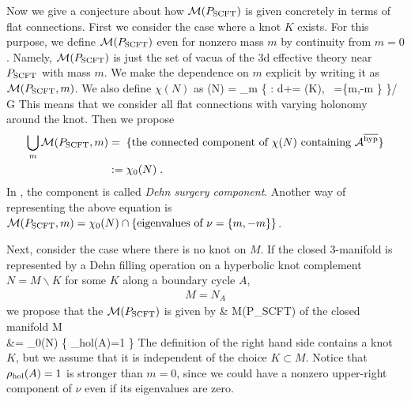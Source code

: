 \documentclass[a4paper,11pt]{article}
\def\cA{\mathcal{A}}
\def\CA{{\cal A}}
\def\CG{{\cal G}}
\def\CM{{\cal M}}
\def\beq#1\eeq{\begin{align}#1\end{align}}
\begin{document}
Now we give a conjecture about how $\CM(P_{\rm SCFT})$ is given concretely in terms of flat connections. 
First we consider the case where a knot $K$ exists.
For this purpose, we define $\CM(P_{\rm SCFT})$ even for nonzero mass $m$ by continuity from $m=0$.
Namely, $\CM(P_{\rm SCFT})$ is just the set of vacua of the 3d effective theory near $P_{\rm SCFT}$ with mass $m$.
We make the dependence on $m$ explicit by writing it as $\CM(P_{\rm SCFT},m)$.
We also define $\chi(N)$ as
\beq
\chi(N) =  \bigcup_m \{ \cA : d\cA+\cA\wedge \cA =\widetilde{ \nu} \delta (K),~ \widetilde{\nu}=\{m,-m \}   \}/ \CG \label{eq:chidef1}
\eeq
This means that we consider all flat connections with varying holonomy around the knot.
Then we propose
%
\begin{align}
\bigcup_m \CM(P_{\rm SCFT},m) &=\; \{\textrm{the connected component of $\chi(N)$ containing $\CA^{\rm \overline{hyp}}$} \} \nonumber \\
& := \chi_0(N)
 \;. \label{Dehn-surgery com}
\end{align}
%
In \cite{tillmann2012degenerations}, the component is called {\it Dehn surgery component}. 
Another way of representing the above equation is $\CM(P_{\rm SCFT},m)  = \chi_0(N) \cap \{ \text{eigenvalues of }\nu=\{ m,-m \} \}$.

Next, consider the case where there is no knot on $M$.
If the closed 3-manifold is represented by a Dehn filling operation on a hyperbolic knot complement $N=M \backslash K$ for some $K$ along a boundary cycle $A$,
%
\begin{align}
M = N_{A}
\end{align}
% 
we propose that the $ \CM(P_{\rm SCFT}) $ is given by
\beq
& \CM(P_{\rm SCFT}) \textrm{ of the closed manifold } M  \nonumber \\
&= \chi_0(N) \cap \{ \rho_{\rm hol}(A)=1 \}
\eeq
The definition of the right hand side contains a knot $K$,
but we assume that it is independent of the choice $K \subset M$.
Notice that $\rho_{\rm hol}(A)=1$ is stronger than $m=0$, since we could have a nonzero upper-right component of $\nu$ even if its eigenvalues are zero.
\end{document}

